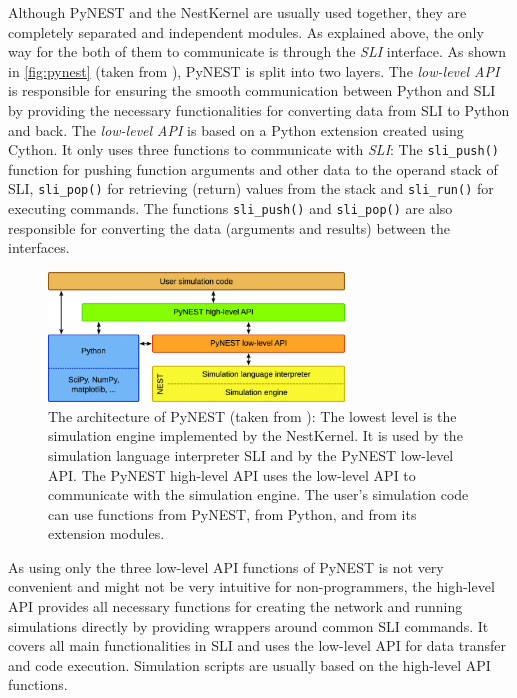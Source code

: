 Although PyNEST and the NestKernel are usually used together, they are completely separated and independent modules. As explained above, the only way for the both of them to communicate is through the \emph{SLI} interface. As shown in \autoref{fig:pynest} (taken from \citet{epp}), PyNEST is split into two layers. The \emph{low-level API} is responsible for ensuring the smooth communication between Python and SLI by providing the necessary functionalities for converting data from SLI to Python and back. The \emph{low-level API} is based on a Python extension created using Cython. It only uses three functions to communicate with \emph{SLI}: The \texttt{sli\_push()} function for pushing function arguments and other data to the operand stack of SLI, \texttt{sli\_pop()} for retrieving (return) values from the stack and \texttt{sli\_run()} for executing commands. The functions \texttt{sli\_push()} and \texttt{sli\_pop()} are also responsible for converting the data (arguments and results) between the interfaces.


\begin{figure}[ht!]
\centering
\includegraphics[width=0.7\textwidth]{src/pic/The-architecture-of-PyNEST-The-lowest-level-is-the-simulation-engine-It-is-used-by.png}
\caption{The architecture of PyNEST (taken from \citep{epp}): The lowest level is the simulation engine implemented by the NestKernel. It is used by the simulation language interpreter SLI and by the PyNEST low-level API. The PyNEST high-level API uses the low-level API to communicate with the simulation engine. The user’s simulation code can use functions from PyNEST, from Python, and from its extension modules.}
\label{fig:pynest}
\end{figure}

As using only the three low-level API functions of PyNEST is not very convenient and might not be very intuitive for non-programmers, the high-level API provides all necessary functions for creating the network and running simulations directly by providing wrappers around common SLI commands. It covers all main functionalities in SLI and uses the low-level API for data transfer and code execution. Simulation scripts are usually based on the high-level API functions.

